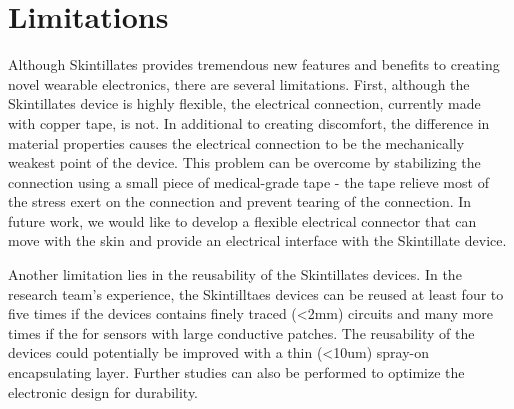 \documentclass{sigchi}
\newcommand{\ignore}[1]{}
\begin{document}
\ignore{Why did you take it home? How long did you keep it on. Who did you show it to. Did you have any public experience. How did you fit this into your daily life? 
Every place: 
Upper arm 
During the course of wearing this, what else would you use it for. Sensing? 
Would you wear this again. Would you wear this on a different location?  

Skintillates was also invited to participate in the two-day exhibition of the National Maker Faire 2015. During which Skintillates LED displays powered by coin cell batteries were given out as part of the exhibit. The LED displays were customized to be a LED lit-up Maker Faire logo, as requested by the event organizer. Users mostly chose to wear the devices on the top of their arms and the outside of their lower legs. The devices were met with great enthusiasm and generated many inspiring conversations. In particular, the displays worn by the event organizer led many Maker Faire participants and potential academic collaborators to visit our booth and offer application suggestions such as displays for events like Burning Man, medical electrodes for children, or custom motion controller for robots.} 


\section {Limitations}
Although Skintillates provides tremendous new features and benefits to creating novel wearable electronics, there are several limitations. First, although the Skintillates device is highly flexible, the electrical connection, currently made with copper tape, is not. In additional to creating discomfort, the difference in material  properties causes the electrical connection to be the mechanically weakest point of the device. This problem can be overcome by stabilizing the connection using a small piece of medical-grade tape - the tape relieve most of the stress exert on the connection and prevent tearing of the connection. In future work, we would like to develop a flexible electrical connector that can move with the skin and provide an electrical interface with the Skintillate device. 

Another limitation lies in the reusability of the Skintillates devices. In the research team's experience, the Skintilltaes devices can be reused at least four to five times if the devices contains finely traced (\textless 2mm) circuits and many more times if the for sensors with large conductive patches. The reusability of the devices could potentially be improved with a thin (<10um) spray-on encapsulating layer. Further studies can also be performed to optimize the electronic design for durability. 
\end{document}
